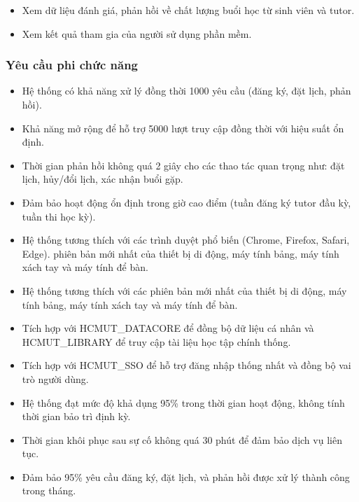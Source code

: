 \begin{itemize}
	\item Xem dữ liệu đánh giá, phản hồi về chất lượng buổi học từ sinh viên và tutor.
\end{itemize}

\begin{itemize}
	\item Xem kết quả tham gia của người sử dụng phần mềm.
\end{itemize}




\subsubsection{Yêu cầu phi chức năng}
\begin{itemize}
	\item Hệ thống có khả năng xử lý đồng thời 1000 yêu cầu (đăng ký, đặt lịch, phản hồi).
	\item Khả năng mở rộng để hỗ trợ 5000 lượt truy cập đồng thời với hiệu suất ổn định.
	\item Thời gian phản hồi không quá 2 giây cho các thao tác quan trọng như: đặt lịch, hủy/đổi lịch, xác nhận buổi gặp.
	\item Đảm bảo hoạt động ổn định trong giờ cao điểm (tuần đăng ký tutor đầu kỳ, tuần thi học kỳ).
\end{itemize}
\begin{itemize}
	\item Hệ thống tương thích với các trình duyệt phổ biến (Chrome, Firefox, Safari, Edge). phiên bản mới nhất của thiết bị di động, máy tính bảng, máy tính xách tay và máy tính để bàn.
	\item Hệ thống tương thích với các phiên bản mới nhất của thiết bị di động, máy tính bảng, máy tính xách tay và máy tính để bàn.
	\item Tích hợp với HCMUT\_DATACORE để đồng bộ dữ liệu cá nhân và HCMUT\_LIBRARY để truy cập tài liệu học tập chính thống.
	\item Tích hợp với HCMUT\_SSO để hỗ trợ đăng nhập thống nhất và đồng bộ vai trò người dùng.
\end{itemize}
\begin{itemize}
	\item Hệ thống đạt mức độ khả dụng 95\% trong thời gian hoạt động, không tính thời gian bảo trì định kỳ.
	\item Thời gian khôi phục sau sự cố không quá 30 phút để đảm bảo dịch vụ liên tục.
	\item Đảm bảo 95\% yêu cầu đăng ký, đặt lịch, và phản hồi được xử lý thành công trong tháng.
\end{itemize}
